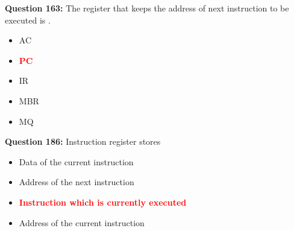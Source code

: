 \documentclass[12pt,a4paper]{article}
\begin{document}
\vspace{0.5cm}

\vspace{0.5cm}

\textbf{Question 163:} The register that keeps the address of next instruction to be executed is \underline{\hspace{1.5cm}}.

\begin{itemize}
    \item[\textbf{A.}] AC
    \item[\textbf{B.}] \textcolor{red}{\textbf{PC}}
    \item[\textbf{C.}] IR
    \item[\textbf{D.}] MBR
    \item[\textbf{E.}] MQ
\end{itemize}

\vspace{0.5cm}

\vspace{0.5cm}

\textbf{Question 186:} Instruction register stores\underline{\hspace{1.5cm}}

\begin{itemize}
    \item[\textbf{A.}] Data of the current instruction
    \item[\textbf{B.}] Address of the next instruction
    \item[\textbf{C.}] \textcolor{red}{\textbf{Instruction which is currently executed}}
    \item[\textbf{D.}] Address of the current instruction
\end{itemize}

\vspace{0.5cm}

\vspace{0.5cm}

\vspace{0.5cm}

\vspace{0.5cm}

\vspace{0.5cm}

\vspace{0.5cm}

\vspace{0.5cm}

\vspace{0.5cm}

\vspace{0.5cm}
\end{document}
